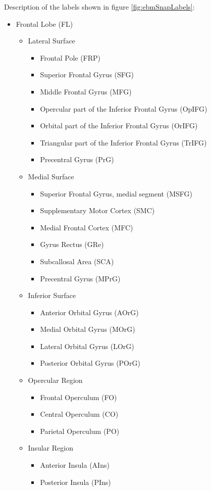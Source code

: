 Description of the labels shown in figure \ref{fig:ebmSnapLabels}:
\begin{itemize}
\item Frontal Lobe (FL)
        \begin{itemize}
        \item Lateral Surface
            \begin{itemize}
            \item Frontal Pole (FRP)
            \item Superior Frontal Gyrus (SFG)
            \item Middle Frontal Gyrus (MFG)
            \item Opercular part of the Inferior Frontal Gyrus (OpIFG)
            \item Orbital part of the Inferior Frontal Gyrus (OrIFG)
            \item Triangular part of the Inferior Frontal Gyrus (TrIFG)
            \item Precentral Gyrus (PrG)    
            \end{itemize}
        \item Medial Surface
            \begin{itemize}
            \item Superior Frontal Gyrus, medial segment (MSFG)
            \item Supplementary Motor Cortex (SMC)
            \item Medial Frontal Cortex (MFC)
            \item Gyrus Rectus (GRe) 
            \item Subcallosal Area (SCA)
            \item Precentral Gyrus (MPrG)
            \end{itemize}
        \item Inferior Surface
            \begin{itemize}
            \item Anterior Orbital Gyrus (AOrG)
            \item Medial Orbital Gyrus (MOrG)
            \item Lateral Orbital Gyrus (LOrG)
            \item Posterior Orbital Gyrus (POrG)
            \end{itemize}
        \item Opercular Region 
            \begin{itemize}
            \item Frontal Operculum (FO)
            \item Central Operculum (CO)
            \item Parietal Operculum (PO)
            \end{itemize}
        \item Insular Region
            \begin{itemize}
            \item Anterior Insula (AIns)
            \item Posterior Insula (PIns)
            \end{itemize}
        \end{itemize}
        

\end{itemize}

